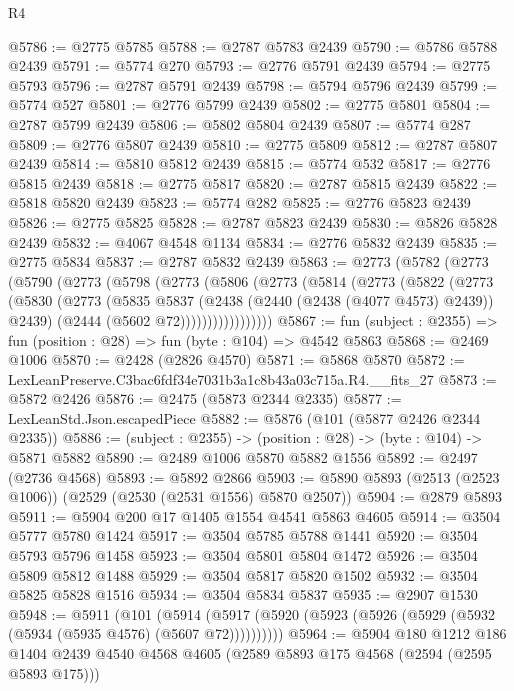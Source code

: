 \begin{lexlean}{R4}
\begin{coremodule}
@5786 := @2775 @5785
@5788 := @2787 @5783 @2439
@5790 := @5786 @5788 @2439
@5791 := @5774 @270
@5793 := @2776 @5791 @2439
@5794 := @2775 @5793
@5796 := @2787 @5791 @2439
@5798 := @5794 @5796 @2439
@5799 := @5774 @527
@5801 := @2776 @5799 @2439
@5802 := @2775 @5801
@5804 := @2787 @5799 @2439
@5806 := @5802 @5804 @2439
@5807 := @5774 @287
@5809 := @2776 @5807 @2439
@5810 := @2775 @5809
@5812 := @2787 @5807 @2439
@5814 := @5810 @5812 @2439
@5815 := @5774 @532
@5817 := @2776 @5815 @2439
@5818 := @2775 @5817
@5820 := @2787 @5815 @2439
@5822 := @5818 @5820 @2439
@5823 := @5774 @282
@5825 := @2776 @5823 @2439
@5826 := @2775 @5825
@5828 := @2787 @5823 @2439
@5830 := @5826 @5828 @2439
@5832 := @4067 @4548 @1134
@5834 := @2776 @5832 @2439
@5835 := @2775 @5834
@5837 := @2787 @5832 @2439
@5863 := @2773
    (@5782
      (@2773
        (@5790
          (@2773
            (@5798
              (@2773
                (@5806
                  (@2773
                    (@5814
                      (@2773
                        (@5822
                          (@2773
                            (@5830
                              (@2773
                                (@5835
                                  @5837
                                  (@2438 (@2440 (@2438 (@4077 @4573) @2439)) @2439)
                                  (@2444 (@5602 @72)))))))))))))))))
@5867 := fun (subject : @2355) => fun (position : @28) => fun (byte : @104) => @4542 @5863
@5868 := @2469 @1006
@5870 := @2428 (@2826 @4570)
@5871 := @5868 @5870
@5872 := LexLeanPreserve.C3bac6fdf34e7031b3a1c8b43a03c715a.R4.__fits_27
@5873 := @5872 @2426
@5876 := @2475 (@5873 @2344 @2335)
@5877 := LexLeanStd.Json.escapedPiece
@5882 := @5876 (@101 (@5877 @2426 @2344 @2335))
@5886 := (subject : @2355) -> (position : @28) -> (byte : @104) -> @5871 @5882
@5890 := @2489 @1006 @5870 @5882 @1556
@5892 := @2497 (@2736 @4568)
@5893 := @5892 @2866
@5903 := @5890 @5893 (@2513 (@2523 @1006)) (@2529 (@2530 (@2531 @1556) @5870 @2507))
@5904 := @2879 @5893
@5911 := @5904 @200 @17 @1405 @1554 @4541 @5863 @4605
@5914 := @3504 @5777 @5780 @1424
@5917 := @3504 @5785 @5788 @1441
@5920 := @3504 @5793 @5796 @1458
@5923 := @3504 @5801 @5804 @1472
@5926 := @3504 @5809 @5812 @1488
@5929 := @3504 @5817 @5820 @1502
@5932 := @3504 @5825 @5828 @1516
@5934 := @3504 @5834 @5837
@5935 := @2907 @1530
@5948 := @5911
    (@101 (@5914 (@5917 (@5920 (@5923 (@5926 (@5929 (@5932 (@5934 (@5935 @4576) (@5607 @72))))))))))
@5964 := @5904
    @180
    @1212
    @186
    @1404
    @2439
    @4540
    @4568
    @4605
    (@2589 @5893 @175 @4568 (@2594 (@2595 @5893 @175)))

\end{coremodule}
\end{lexlean}
